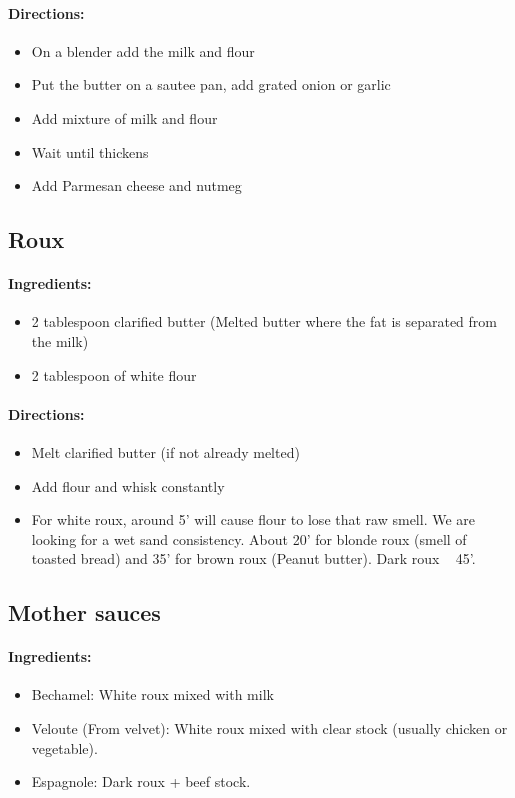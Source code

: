\documentclass{article}
\begin{document}
\paragraph{Directions:}
\begin{itemize}
    \item On a blender add the milk and flour
    \item Put the butter on a sautee pan, add grated onion or garlic
    \item Add mixture of milk and flour
    \item Wait until thickens
    \item Add Parmesan cheese and nutmeg
\end{itemize}

\subsection{Roux}

\paragraph{Ingredients:}
\begin{itemize}
    \item 2 tablespoon clarified butter (Melted butter where the fat is separated from the milk)
    \item 2 tablespoon of white flour
\end{itemize}

\paragraph{Directions:}
\begin{itemize}
    \item Melt clarified butter (if not already melted)
    \item Add flour and whisk constantly
    \item For white roux, around 5' will cause flour to lose that raw smell. We are looking for a wet sand consistency. About 20' for blonde roux (smell of toasted bread) and 35' for brown roux (Peanut butter). Dark roux ~ 45'.
\end{itemize}

\subsection{Mother sauces}

\paragraph{Ingredients:}
\begin{itemize}
    \item Bechamel: White roux mixed with milk
    \item Veloute (From velvet): White roux mixed with clear stock (usually chicken or vegetable).
    \item Espagnole: Dark roux + beef stock.
\end{itemize}
\end{document}
